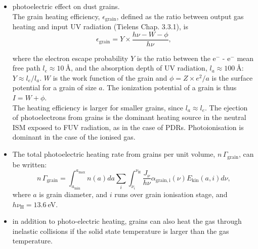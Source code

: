 \foilhead{}

\begin{itemize}
\item photoelectric effect on dust grains. \\
The grain heating efficiency, $\epsilon_\mathrm{grain}$, defined as the
ratio between output gas heating and input UV radiation (Tielens
Chap. 3.3.1), is 
\[ \epsilon_\mathrm{grain} =  Y \times \frac{h\nu - W - \phi }{h\nu}
,\]

where the electron escape probability $Y$ is the ratio between the
e$^-$ - e$^-$ mean free path $l_e \approx 10~$\AA, and the absorption
depth of UV radiation, $l_a \approx 100~$\AA: $Y \approx l_e /
l_a$. $W$ is the work function of the grain and $\phi = Z \times e^2 /
a$ is the surface potential for a grain of size $a$. The ionization
potential of a grain is thus $ I = W + \phi$. \\ The heating
efficiency is larger for smaller grains, since $l_a \approx l_e$.
{\large The ejection of photoelectrons from grains is the dominant
heating source in the neutral ISM exposed to FUV radiation, as in the
case of PDRs. Photoionisation is dominant in the case of the ionised
gas.}
\end{itemize}


\foilhead{}
\begin{itemize}
\item The total photoelectric  heating  rate from grains per unit volume, $n\,\Gamma_\mathrm{grain}$, can be written:
\[ n\,\Gamma_\mathrm{grain} = \int_{a_\mathrm{min}}^{a_\mathrm{max}}
n(a) da \sum_i \int_{\nu_i}^{\nu_\mathrm{H}} \frac{J_\nu}{h\nu}
\alpha_\mathrm{grain,i}(\nu) E_\mathrm{kin}(a,i) d\nu   , \]
where $a$ is grain diameter, and $i$ runs over grain ionisation stage,
and $ h \nu_\mathrm{H} = 13.6~$eV.

\item in addition to photo-electric heating, grains can also heat the
gas through inelastic collisions if the solid state temperature is
larger than the gas temperature. 
\end{itemize}
 

\foilhead{}


